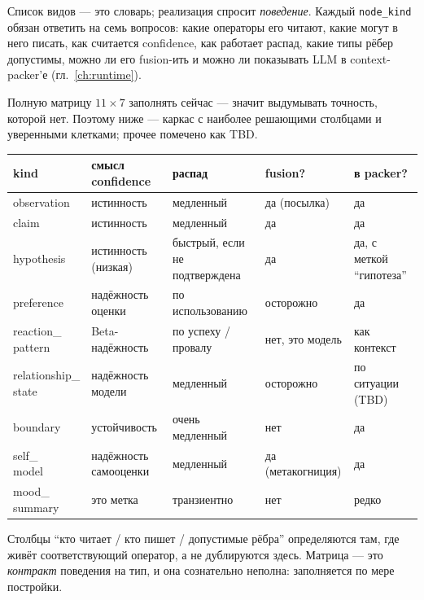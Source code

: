 Список видов --- это словарь; реализация спросит \emph{поведение}. Каждый
\texttt{node\_kind} обязан ответить на семь вопросов: какие операторы его
читают, какие могут в него писать, как считается confidence, как работает
распад, какие типы рёбер допустимы, можно ли его fusion-ить и можно ли
показывать LLM в context-packer'е (гл.~\ref{ch:runtime}).

Полную матрицу $11 \times 7$ заполнять сейчас --- значит выдумывать точность,
которой нет. Поэтому ниже --- каркас с наиболее решающими столбцами и
уверенными клетками; прочее помечено как TBD.

\begin{center}
\begingroup
\small
\setlength{\tabcolsep}{4pt}
\begin{tabular}{@{}p{} p{} p{} p{} p{}@{}}
\toprule
\textbf{kind} & \textbf{смысл confidence} & \textbf{распад} & \textbf{fusion?} & \textbf{в packer?} \\
\midrule
observation & истинность & медленный & да (посылка) & да \\
claim & истинность & медленный & да & да \\
hypothesis & истинность (низкая) & быстрый, если не подтверждена & да & да, с меткой ``гипотеза'' \\
preference & надёжность оценки & по использованию & осторож\-но & да \\
\shortstack[l]{reaction\_\\pattern} & Beta-надёжность & по успеху / провалу & нет, это модель & как контекст \\
\shortstack[l]{relationship\_\\state} & надёжность модели & медленный & осторож\-но & \shortstack[l]{по ситуации\\(TBD)} \\
boundary & устойчивость & очень медленный & нет & да \\
\shortstack[l]{self\_\\model} & надёжность самооценки & медленный & да (метакогниция) & да \\
\shortstack[l]{mood\_\\summary} & это метка & транзиент\-но & нет & редко \\
\bottomrule
\end{tabular}
\endgroup
\end{center}

Столбцы ``кто читает / кто пишет / допустимые рёбра'' определяются там, где
живёт соответствующий оператор, а не дублируются здесь. Матрица --- это
\emph{контракт} поведения на тип, и она сознательно неполна: заполняется по
мере постройки.

